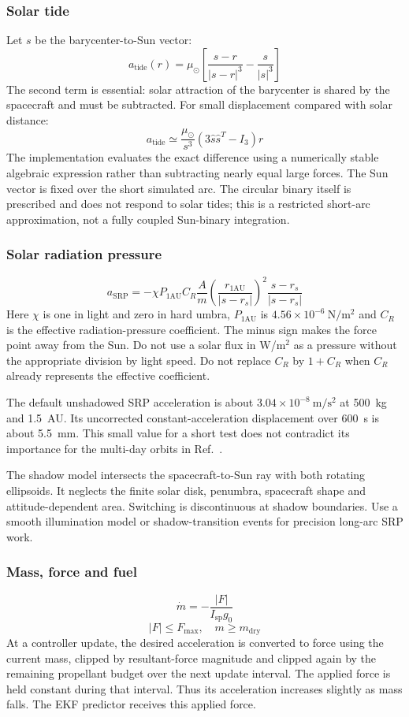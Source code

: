 \documentclass[11pt,a4paper]{article}
\begin{document}
\subsubsection{Solar tide}
Let $s$ be the barycenter-to-Sun vector:
\[ a_{\mathrm{tide}}(r) = \mu_{\odot} \left[ \frac{s - r}{|s - r|^{3}} - \frac{s}{|s|^{3}} \right] \]
The second term is essential: solar attraction of the barycenter is shared by the spacecraft and must be subtracted. For small displacement compared with solar distance:
\[ a_{\mathrm{tide}} \simeq \frac{\mu_{\odot}}{s^{3}} (3\hat{s}\hat{s}^{T} - I_{3})r \]
The implementation evaluates the exact difference using a numerically stable algebraic expression rather than subtracting nearly equal large forces. The Sun vector is fixed over the short simulated arc. The circular binary itself is prescribed and does not respond to solar tides; this is a restricted short-arc approximation, not a fully coupled Sun-binary integration.

\subsubsection{Solar radiation pressure}
\[ a_{\mathrm{SRP}} = -\chi P_{1\mathrm{AU}} C_{R} \frac{A}{m} \left( \frac{r_{1\mathrm{AU}}}{|s - r_{s}|} \right)^{2} \frac{s - r_{s}}{|s - r_{s}|} \]
Here $\chi$ is one in light and zero in hard umbra, $P_{1\mathrm{AU}}$ is $4.56 \times 10^{-6}\mathrm{~N/m^2}$ and $C_R$ is the effective radiation-pressure coefficient. The minus sign makes the force point away from the Sun. Do not use a solar flux in W/m$^2$ as a pressure without the appropriate division by light speed. Do not replace $C_R$ by $1+C_R$ when $C_R$ already represents the effective coefficient.

The default unshadowed SRP acceleration is about $3.04 \times 10^{-8}\mathrm{~m/s^2}$ at 500~kg and 1.5~AU. Its uncorrected constant-acceleration displacement over 600~s is about 5.5~mm. This small value for a short test does not contradict its importance for the multi-day orbits in Ref.~\cite{voyatzis}.

The shadow model intersects the spacecraft-to-Sun ray with both rotating ellipsoids. It neglects the finite solar disk, penumbra, spacecraft shape and attitude-dependent area. Switching is discontinuous at shadow boundaries. Use a smooth illumination model or shadow-transition events for precision long-arc SRP work.

\subsubsection{Mass, force and fuel}
\[ \dot{m} = -\frac{|F|}{I_{\mathrm{sp}} g_{0}} \]
\[ |F| \le F_{\mathrm{max}}, \quad m \ge m_{\mathrm{dry}} \]
At a controller update, the desired acceleration is converted to force using the current mass, clipped by resultant-force magnitude and clipped again by the remaining propellant budget over the next update interval. The applied force is held constant during that interval. Thus its acceleration increases slightly as mass falls. The EKF predictor receives this applied force.
\end{document}
